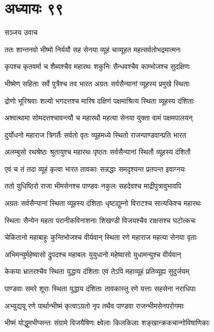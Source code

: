 \chapter{अध्यायः ९९}
\twolineshloka
{सञ्जय उवाच}
{}


\twolineshloka
{ततः शान्तनवो भीष्मो निर्ययौ सह सेनया}
{व्यूहं चाव्यूहत महत्सर्वतोभद्रमात्मनः}


\twolineshloka
{कृपश्च कृतवर्मा च शैब्यश्चैव महारथः}
{शकुनिः सैन्धवश्चैव काम्भोजश्च सुदक्षिणः}


\twolineshloka
{भीष्मेण सहिताः सर्वे पुत्रैश्च तव भारत}
{अग्रतः सर्वसैन्यानां व्यूहस्य प्रमुखे स्थिताः}


\twolineshloka
{द्रोणो भूरिश्रवाः शल्यो भगदत्तश्च मारिष}
{दक्षिणं पक्षमाश्रित्य स्थिता व्यूहस्य दंशिताः}


\twolineshloka
{अश्वत्थामा सोमदत्तश्चावन्त्यौ च महारथौ}
{महत्या सेनया युक्ता वामं पक्षमपालयन्}


\twolineshloka
{दुर्योधनो महाराज त्रिगर्तैः सर्वतो वृतः}
{व्यूहमध्ये स्थितो राजन्पाण्डवान्प्रति भारत}


\twolineshloka
{अलम्बुसो रथश्रेष्ठः श्रुतायुश्च महारथः}
{पृष्ठतः सर्वसैन्यानां स्थितौ व्यूहस्य दंशितौ}


\twolineshloka
{एवं च तं तदा व्यूहं कृत्वा भारत तावकाः}
{सन्नद्धाः समदृश्यन्त प्रतपन्त इवाग्नयः}


\twolineshloka
{ततो युधिष्ठिरो राजा भीमसेनश्च पाण्डवः}
{नकुलः सहदेवश्च माद्रीपुत्रावुभावपि}


\twolineshloka
{अग्रतः सर्वसैन्यानां स्थिता व्यूहस्य दंशिताः}
{धृष्टद्युम्नो विराटश्च सात्यकिश्च महारथः}


\twolineshloka
{स्थिताः सैन्येन महता परानीकविनाशनाः}
{शिखण्डी विजयश्चैव राक्षसश्च घटोत्कचः}


\twolineshloka
{चेकितानो महाबाहुः कुन्तिभोजश्च वीर्यवान्}
{स्थिता रणे महाराज महत्या सेनया वृताः}


\twolineshloka
{अभिमन्युर्महेष्वासो द्रुपदश्च महाबलः}
{युयुधानो महेष्वासो युधामन्युश्च वीर्यवान्}


\twolineshloka
{केकया भ्रातरश्चैव स्थिता युद्धाय दंशिताः}
{एवं तेऽपि महाव्यूहं प्रतिव्यूह्य सुदुर्जयम्}


\twolineshloka
{पाण्डवाः समरे शूराः स्थिता युद्धाय दंशिताः}
{तावकास्तु रणे यत्ताः सहसेना नराधिपाः}


\twolineshloka
{अभ्युद्ययू रणे पार्थान्भीष्मं कृत्वाऽग्रतो नृप}
{तथैव पाण्डवा राजन्भीमसेनपरोगमाः}


\twolineshloka
{भीष्मं योद्धुमभीप्सन्तः संग्रामे विजयैषिणः}
{क्ष्वेलाः किलकिलाः शङ्खान्क्रकचान्गोविषाणिकाः}


